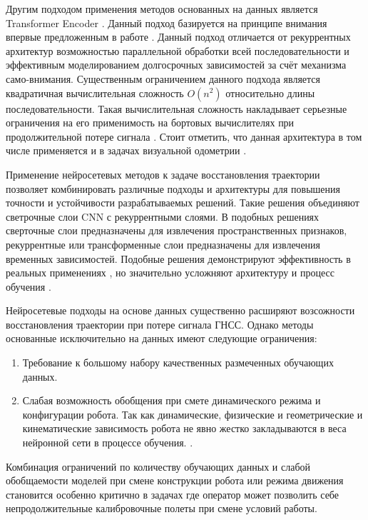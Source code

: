 Другим подходом применения методов основанных на данных является Transformer Encoder \cite{Guyard2025}. Данный подход базируется на принципе внимания впервые предложенным в работе \cite{Mohiuddin2023}. Данный подход отличается от рекуррентных архитектур возможностью параллельной обработки всей последовательности и эффективным моделированием долгосрочных зависимостей за счёт механизма само-внимания. 
Существенным ограничением данного подхода является квадратичная вычислительная сложность \(O(n^2)\) относительно длины последовательности.
Такая вычислительная сложность накладывает серьезные ограничения на его применимость на бортовых вычислителях при продолжительной потере сигнала \cite{Almassri2022}. Стоит отметить, что данная архитектура в том числе применяется и в задачах визуальной одометрии \cite{Yugay2025}.


Применение нейросетевых методов к задаче восстановления траектории позволяет комбинировать различные подходы и архитектуры для повышения точности и устойчивости разрабатываемых решений. Такие решения объединяют светрочные слои CNN с рекуррентными слоями. В подобных решениях сверточные слои предназначены для извлечения пространственных признаков, рекуррентные или трансформенные слои предназначены для  извлечения временных зависимостей. Подобные решения демонстрируют эффективность в реальных применениях \cite{Molina-Leal2021, neurobem2021}, но значительно усложняют архитектуру и процесс обучения \cite{actuator_informed2022}.  

Нейросетевые подходы на основе данных существенно расширяют возсожности восстановления траектории при потере сигнала ГНСС. Однако методы основанные исключительно на данных имеют следующие ограничения:
\begin{enumerate}
	\item Требование к большому набору качественных размеченных обучающих данных\cite{Sun2025, Yugay2025}. 
	\item Слабая возможность обобщения при смете динамического режима и конфигурации робота. Так как динамические, физические и геометрические и кинематические зависимость робота не явно жестко закладываются в веса нейронной сети в процессе обучения. \cite{Molina-Leal2021, actuator_informed2022, ssm_actuator2025}.
\end{enumerate}	

Комбинация ограничений по количеству обучающих данных и слабой обобщаемости моделей при смене конструкции робота или режима движения становится особенно критично в задачах где оператор может позволить себе непродолжительные калибровочные полеты при смене условий работы\cite{Almassri2022, Sun2025, Yugay2025, Molina-Leal2021, neurobem2021, actuator_informed2022, ssm_actuator2025}. 



